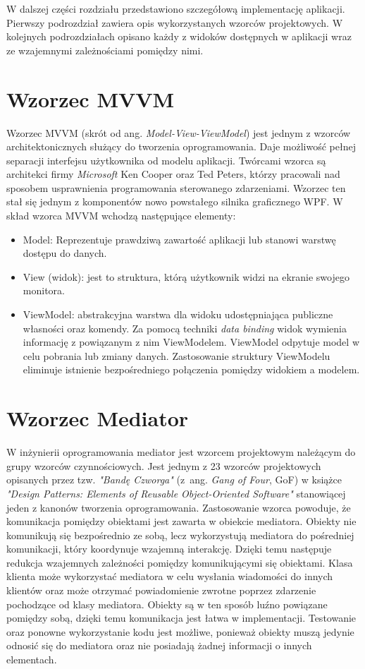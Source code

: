 W dalszej części rozdziału przedstawiono szczegółową implementację aplikacji. Pierwszy podrozdział zawiera opis wykorzystanych wzorców projektowych. W kolejnych podrozdziałach opisano każdy z widoków dostępnych w aplikacji wraz ze wzajemnymi zależnościami pomiędzy nimi.

\section{Wzorzec MVVM}
Wzorzec MVVM (skrót od ang. \textit{Model-View-ViewModel}) jest jednym z wzorców architektonicznych służący do tworzenia oprogramowania. Daje możliwość pełnej separacji interfejsu użytkownika od modelu aplikacji. Twórcami wzorca są architekci firmy \textit{Microsoft} Ken Cooper oraz Ted Peters, którzy pracowali nad sposobem usprawnienia programowania sterowanego zdarzeniami. Wzorzec ten stał się jednym z komponentów nowo powstałego silnika graficznego WPF. 
W skład wzorca MVVM wchodzą następujące elementy:
\begin{itemize}
	\item Model: Reprezentuje prawdziwą zawartość aplikacji lub stanowi warstwę dostępu do danych.
	\item View (widok): jest to struktura, którą użytkownik widzi na ekranie swojego monitora.
	\item ViewModel: abstrakcyjna warstwa dla widoku udostępniająca publiczne własności oraz komendy. Za pomocą techniki \textit{data binding} widok wymienia informację z powiązanym z nim ViewModelem. ViewModel odpytuje model w celu pobrania lub zmiany danych. Zastosowanie struktury ViewModelu eliminuje istnienie bezpośredniego połączenia pomiędzy widokiem a modelem.
\end{itemize}

\section{Wzorzec Mediator}
\label{sec: mediator}
W inżynierii oprogramowania mediator jest wzorcem projektowym należącym do grupy wzorców czynnościowych. Jest jednym z 23 wzorców projektowych opisanych przez tzw. \textit{"Bandę Czworga"} (z~ang. \textit{Gang of Four}, GoF) w książce \textit{"Design Patterns: Elements of Reusable Object-Oriented Software"} stanowiącej jeden z kanonów tworzenia oprogramowania. Zastosowanie wzorca powoduje, że komunikacja pomiędzy obiektami jest zawarta w obiekcie mediatora. Obiekty nie komunikują się bezpośrednio ze sobą, lecz wykorzystują mediatora do pośredniej komunikacji, który koordynuje wzajemną interakcję.  Dzięki temu następuje redukcja wzajemnych zależności pomiędzy komunikującymi się obiektami. Klasa klienta może wykorzystać mediatora w celu wysłania wiadomości do innych klientów oraz może otrzymać powiadomienie zwrotne poprzez zdarzenie pochodzące od klasy mediatora. Obiekty są w ten sposób luźno powiązane pomiędzy sobą, dzięki temu komunikacja jest łatwa w implementacji. Testowanie oraz ponowne wykorzystanie kodu jest możliwe, ponieważ obiekty muszą jedynie odnosić się do mediatora oraz nie posiadają żadnej informacji o innych elementach.

